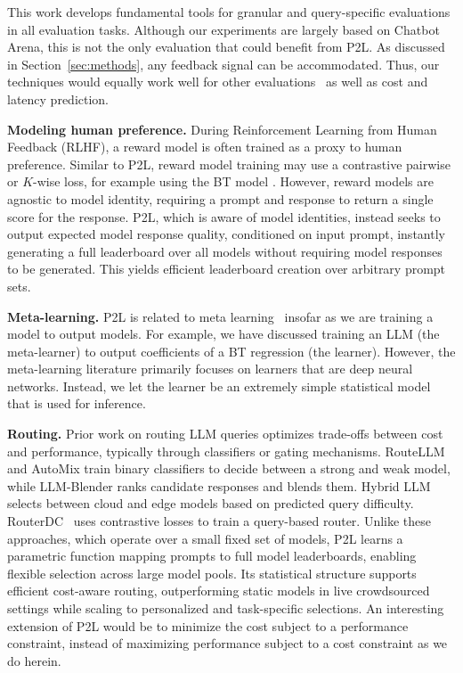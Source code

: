 
This work develops fundamental tools for granular and query-specific evaluations in all evaluation tasks. 
Although our experiments are largely based on Chatbot Arena, this is not the only evaluation that could benefit from P2L.
As discussed in Section~\ref{sec:methods}, any feedback signal can be accommodated.
Thus, our techniques would equally work well for other evaluations~\cite{hendrycks2020measuring, zellers2019hellaswag, cobbe2021training, srivastava2023beyond, zhong2023agieval, chen2021evaluating, lin2023toxicchat, liang2022helm} as well as cost and latency prediction.

\textbf{Modeling human preference.} During Reinforcement Learning from Human Feedback (RLHF), a reward model is often trained as a proxy to human preference. Similar to P2L, reward model training may use a contrastive pairwise or $K$-wise loss, for example using the BT model \citep{christiano2023deep, bai2022training, ouyang2022training, zhu2023principled}. However, reward models are agnostic to model identity, requiring a prompt and response to return a single score for the response. P2L, which is aware of model identities, instead seeks to output expected model response quality, conditioned on input prompt, instantly generating a full leaderboard over all models without requiring model responses to be generated. This yields efficient leaderboard creation over arbitrary prompt sets.

\textbf{Meta-learning.} P2L is related to meta learning~\cite{schmidhuber1987evolutionary, santoro2016meta, finn2017model} insofar as we are training a model to output models. For example, we have discussed training an LLM (the meta-learner) to output coefficients of a BT regression (the learner). However, the meta-learning literature primarily focuses on learners that are deep neural networks. Instead, we let the learner be an extremely simple statistical model that is used for inference.

\textbf{Routing.} Prior work on routing LLM queries optimizes trade-offs between cost and performance, typically through classifiers or gating mechanisms. RouteLLM \citep{ong2024routellm} and AutoMix \citep{madaan2023automix} train binary classifiers to decide between a strong and weak model, while LLM-Blender \citep{jiang2023llm} ranks candidate responses and blends them. Hybrid LLM \citep{ding2024hybrid} selects between cloud and edge models based on predicted query difficulty. RouterDC~\cite{chen2024routerdcquerybasedrouterdual} uses contrastive losses to train a query-based router. Unlike these approaches, which operate over a small fixed set of models, P2L learns a parametric function mapping prompts to full model leaderboards, enabling flexible selection across large model pools. Its statistical structure supports efficient cost-aware routing, outperforming static models in live crowdsourced settings while scaling to personalized and task-specific selections.
An interesting extension of P2L would be to minimize the cost subject to a performance constraint, instead of maximizing performance subject to a cost constraint as we do herein.


